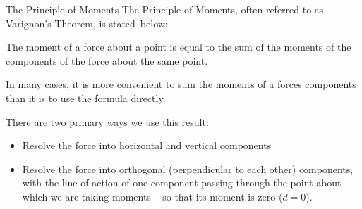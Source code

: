 \documentclass[9pt, xcolor={svgnames, x11names},professionalfonts]{beamer}
\def\scale{1}
\begin{document}
\begin{frame}{}

	\begin{myexer}{}{}
		\def\scale{0.65}
		
	\end{myexer}
\end{frame}


\begin{frame}{The Principle of Moments}
	The Principle of Moments,  often referred to as Varignon's Theorem, is stated~below:\parm
	\begin{statsbox}[title=Varignon's Theorem, left=5mm, right=5mm]
		\centering
		The moment of a force about a point  is equal to the sum of the moments of the components of the force about the same point.
	\end{statsbox}
	\parb
	In many cases, it is more convenient to sum the moments of a forces components than it is to use the formula directly.

	There are two primary ways we use this result:
	\begin{itemize}
		\item Resolve the force into horizontal and vertical components
		\item Resolve the force into orthogonal (perpendicular to each other) components, with the line of action of one component passing through the point about which we are taking moments -- so that its moment is zero ($d=0$).
	\end{itemize}

\end{frame}

\end{document}
